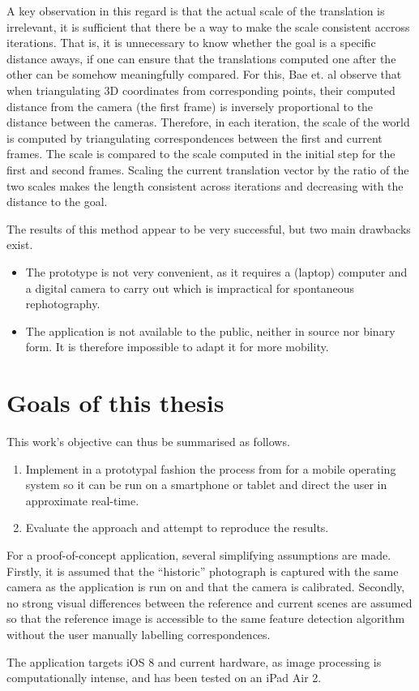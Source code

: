A key observation in this regard is that the actual scale of the translation is
irrelevant, it is sufficient that there be a way to make the scale consistent
accross iterations. That is, it is unnecessary to know whether the goal is a
specific distance aways, if one can ensure that the translations computed one
after the other can be somehow meaningfully compared. For this, Bae et. al
observe that when triangulating 3D coordinates from corresponding points, their
computed distance from the camera (the first frame) is inversely proportional
to the distance between the cameras. Therefore, in each iteration, the scale of
the world is computed by triangulating correspondences between the first and
current frames. The scale is compared to the scale computed in the initial step
for the first and second frames. Scaling the current translation vector by the
ratio of the two scales makes the length consistent across iterations and
decreasing with the distance to the goal.

The results of this method appear to be very successful, but two main drawbacks
exist.
\begin{itemize}
   \item The prototype is not very convenient, as it requires a (laptop)
      computer and a digital camera to carry out which is impractical for
      spontaneous rephotography.
   \item The application is not available to the public, neither in source nor
      binary form. It is therefore impossible to adapt it for more mobility.
\end{itemize}

\section{Goals of this thesis}

This work's objective can thus be summarised as follows.
\begin{enumerate}
   \item Implement in a prototypal fashion the process from \citep{bae2010} for
      a mobile operating system so it can be run on a smartphone or tablet and
      direct the user in approximate real-time.
   \item Evaluate the approach and attempt to reproduce the results.
\end{enumerate}

For a proof-of-concept application, several simplifying assumptions are made.
Firstly, it is assumed that the ``historic'' photograph is captured with the
same camera as the application is run on and that the camera is calibrated.
Secondly, no strong visual differences between the reference and current scenes
are assumed so that the reference image is accessible to the same feature
detection algorithm without the user manually labelling correspondences. 

The application targets iOS 8 and current hardware, as image processing is
computationally intense, and has been tested on an iPad Air 2.
